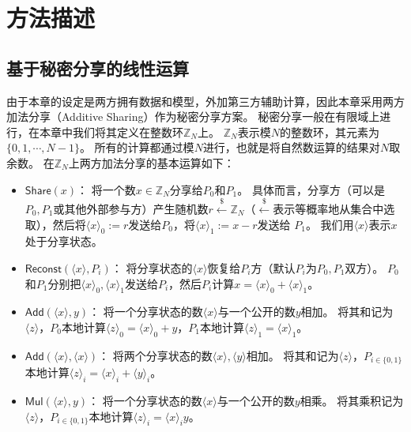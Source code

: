 \section{方法描述}
\subsection{基于秘密分享的线性运算}
由于本章的设定是两方拥有数据和模型，外加第三方辅助计算，因此本章采用两方加法分享（Additive Sharing）作为秘密分享方案。
%
秘密分享一般在有限域上进行，在本章中我们将其定义在整数环$\mathbb Z_N$上。
%
$\mathbb Z_N$表示模$N$的整数环，其元素为$\{0, 1, \cdots, N - 1\}$。
所有的计算都通过模$N$进行，也就是将自然数运算的结果对$N$取余数。
%
在$\mathbb  Z_N$上两方加法分享的基本运算如下：
\begin{itemize}
    \item $\mathsf{Share}(x)$：
    将一个数$x \in \mathbb Z_N$分享给$P_0$和$P_1$。
    具体而言，分享方（可以是$P_0, P_1$或其他外部参与方）产生随机数$r \stackrel{\$}{\gets} \mathbb Z_N$（$\stackrel{\$}{\gets}$表示等概率地从集合中选取），然后将$\langle x \rangle_0 := r$发送给$P_0$，将$\langle x \rangle_1 := x - r$发送给 $P_1$。
    我们用$\langle  x \rangle$表示$x$处于分享状态。

    \item $\mathsf{Reconst}(\langle x \rangle, P_i)$：
    将分享状态的$\langle x \rangle$恢复给$P_i$方（默认$P_i$为$P_0,P_1$双方）。
    $P_0$和$P_1$分别把$\langle x \rangle_0, \langle x \rangle_1$发送给$P_i$，然后$P_i$计算$x = \langle x \rangle_0 + \langle x \rangle_1$。

    \item $\mathsf{Add}(\langle x \rangle, y)$：
    将一个分享状态的数$\langle x \rangle$与一个公开的数$y$相加。
    将其和记为$\langle z \rangle$，$P_0$本地计算$\langle z \rangle_0 = \langle x \rangle_0 + y$，$P_1$本地计算$\langle z \rangle_1 = \langle x \rangle_1$。
    
    \item $\mathsf{Add}(\langle x \rangle, \langle x \rangle)$：
    将两个分享状态的数$\langle x \rangle, \langle y \rangle$相加。
    将其和记为$\langle z \rangle$，$P_{i\in \{0, 1\}}$本地计算$\langle z\rangle_i = \langle x \rangle_i + \langle y \rangle_i$。
    
    \item $\mathsf{Mul}(\langle x \rangle, y)$：
    将一个分享状态的数$\langle x \rangle$与一个公开的数$y$相乘。
    将其乘积记为$\langle z \rangle$，$P_{i\in \{0, 1\}}$本地计算$\langle z\rangle_i = \langle x \rangle_i y$。


\end{itemize}
